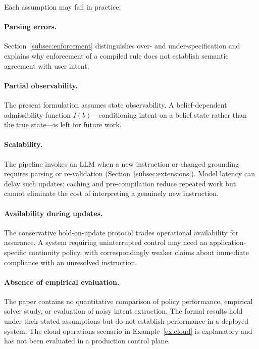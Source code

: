 \documentclass[journal]{IEEEtran}
\theoremstyle{definition}
\begin{document}
Each assumption may fail in practice:

\paragraph{Parsing errors.}
Section~\ref{subsec:enforcement} distinguishes over- and under-specification
and explains why enforcement of a compiled rule does not establish semantic
agreement with user intent.

\paragraph{Partial observability.} The present formulation assumes state
observability. A belief-dependent
admissibility function $I(b)$---conditioning intent on a belief state
rather than the true state---is left for future work.

\paragraph{Scalability.} The pipeline invokes an LLM when a new instruction or
changed grounding requires parsing or re-validation
(Section~\ref{subsec:extensions}). Model latency can delay such updates;
caching and pre-compilation reduce repeated work but cannot eliminate the cost
of interpreting a genuinely new instruction.

\paragraph{Availability during updates.}
The conservative hold-on-update protocol trades operational availability for
assurance. A system requiring uninterrupted control may need an
application-specific continuity policy, with correspondingly weaker claims
about immediate compliance with an unresolved instruction.

\paragraph{Absence of empirical evaluation.}
The paper contains no quantitative comparison of policy performance, empirical
solver study, or evaluation of noisy intent extraction. The formal results
hold under their stated assumptions but do not establish performance in a
deployed system. The cloud-operations scenario in Example~\ref{ex:cloud} is
explanatory and has not been evaluated in a production control plane.

\end{document}
